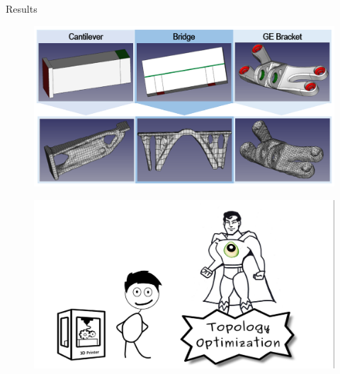 \begin{frame}{Results}
\begin{figure}
		\includegraphics[width=1\linewidth]{Pictures/SecondHalf/TestCases.png}
		\end{figure}

\end{frame}
\begin{frame}
\begin{figure}

\vspace{-.7cm}	
\hspace{-2cm}		\includegraphics[width=1.2\linewidth]{Pictures/animations/animation_10.png}
		\end{figure}

\end{frame}







